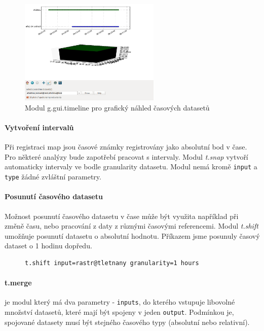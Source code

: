 \documentclass[a4paper,12pt,oneside]{report}
\begin{document}
\begin{figure}[h!]
    \centering
    \includegraphics[width=0.6\textwidth]{./img/temporal/timeline.png}
    \caption[Timeline]{\centering  Modul g.gui.timeline pro grafický náhled časových datasetů}
 \end{figure}  




\paragraph*{Vytvoření intervalů} Při registraci map jsou časové známky registrovány jako absolutní bod v čase. Pro některé analýzy bude zapotřebí pracovat s intervaly. Modul \textit{t.snap} vytvoří automaticky intervaly ve bodle granularity datasetu. Modul nemá kromě \texttt{input} a \texttt{type} žádné zvláštní parametry.



\paragraph*{Posunutí časového datasetu} Možnost posunutí časového datasetu v čase může být využita například při změně času, nebo pracování z daty z různými časovými referencemi. Modul \textit{t.shift} umožňuje posunutí datasetu o absolutní hodnotu. Příkazem jsme posunuly časový dataset o 1 hodinu dopředu. 
\begin{figure}[h!]
\begin{footnotesize}
\lstset{extendedchars=false,
escapeinside=''}
\begin{lstlisting}[style=mybash]
t.shift input=rastr@tletnany granularity=1 hours
\end{lstlisting}
\end{footnotesize} 
\end{figure}



\paragraph*{t.merge} je modul který má dva  parametry - \texttt{inputs}, do kterého vstupuje libovolné množství datasetů, které mají být spojeny v jeden \texttt{output}. Podmínkou je, spojované datasety musí být  stejného  časového typy (absolutní nebo relativní).
\end{document}
